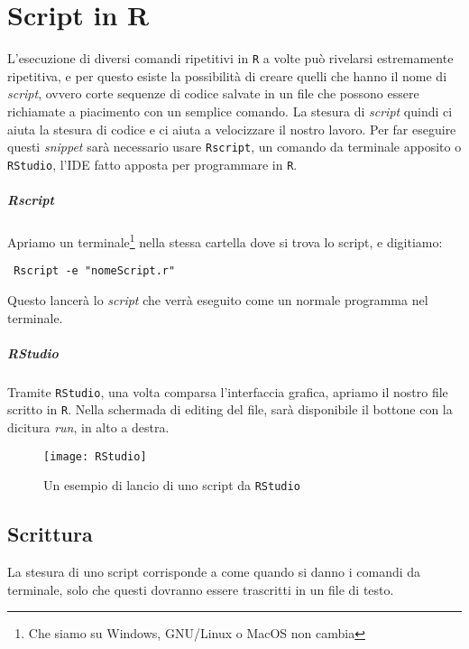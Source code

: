 \chapter{Script in R}

L'esecuzione di diversi comandi ripetitivi in \texttt{R} a volte può rivelarsi 
estremamente ripetitiva, e per questo esiste la possibilità di creare quelli che 
hanno il nome di \textit{script}, ovvero corte sequenze di codice salvate in un 
file che possono essere richiamate a piacimento con un semplice comando.
La stesura di \textit{script} quindi ci aiuta la stesura di codice e ci aiuta a 
velocizzare il nostro lavoro. Per far eseguire questi \textit{snippet} sarà 
necessario usare \texttt{Rscript}, un comando da terminale apposito o 
\texttt{RStudio}, l'IDE fatto apposta per programmare in \texttt{R}.

\paragraph*{Rscript} Apriamo un terminale\footnote{Che siamo su Windows, 
GNU/Linux o MacOS non cambia} nella stessa cartella dove si trova lo script, e 
digitiamo:
\begin{lstlisting}
 Rscript -e "nomeScript.r"
\end{lstlisting}
Questo lancerà lo \textit{script} che verrà eseguito come un normale programma 
nel terminale.

\paragraph*{RStudio} Tramite \texttt{RStudio}, una volta comparsa l'interfaccia 
grafica, apriamo il nostro file scritto in \texttt{R}. Nella schermada di 
editing del file, sarà disponibile il bottone con la dicitura \textit{run}, in 
alto a destra.

\begin{figure}[h]
  \centering
  \texttt{[image: RStudio]}
  \caption{Un esempio di lancio di uno script da \texttt{RStudio}}
\end{figure}

\section{Scrittura}

La stesura di uno script corrisponde a come quando si danno i comandi da 
terminale, solo che questi dovranno essere trascritti in un file di testo.